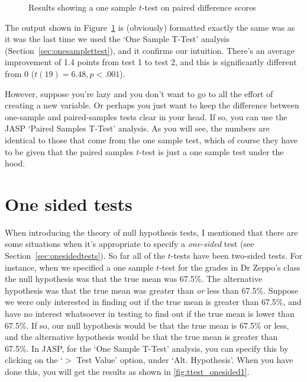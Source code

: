 \begin{figure}[htb]
\begin{center}
\caption{Results showing a one sample $t$-test on paired difference scores}
\label{fig:ttest_paired2}
\HR
\end{center}
\end{figure}

The output shown in Figure~\ref{fig:ttest_paired2} is (obviously) formatted exactly the same was as it was the last time we used the `One Sample T-Test' analysis (Section~\ref{sec:onesamplettest}), and it confirms our intuition. There's an average improvement of 1.4 points from test 1 to test 2, and this is significantly different from 0 ($t(19)=6.48, p<.001$). 

However, suppose you're lazy and you don't want to go to all the effort of creating a new variable. Or perhaps you just want to keep the difference between one-sample and paired-samples tests clear in your head. If so, you can use the JASP `Paired Samples T-Test' analysis.  As you will see, the numbers are identical to those that come from the one sample test, which of course they have to be given that the paired samples $t$-test is just a one sample test under the hood. 


\section{One sided tests~\label{sec:onesidedttest}}

When introducing the theory of null hypothesis tests, I mentioned that there are some situations when it's appropriate to specify a {\it one-sided} test (see Section~\ref{sec:onesidedtests}). So far all of the $t$-tests have been two-sided tests. For instance, when we specified a one sample $t$-test for the grades in Dr Zeppo's class the null hypothesis was that the true mean was 67.5\%. The alternative hypothesis was that the true mean was greater than {\it or} less than 67.5\%. Suppose we were only interested in finding out if the true mean is greater than 67.5\%, and have no interest whatsoever in testing to find out if the true mean is lower than 67.5\%. If so, our null hypothesis would be that the true mean is 67.5\% or less, and the alternative hypothesis would be that the true mean is greater than 67.5\%. In JASP, for the `One Sample T-Test' analysis, you can specify this by clicking on the `$>$ Test Value' option, under `Alt. Hypothesis'. When you have done this, you will get the results as shown in \ref{fig:ttest_onesided1}.

